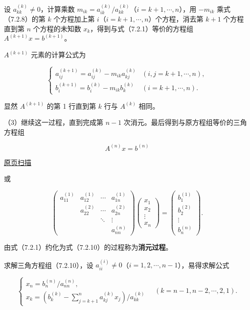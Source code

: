 \documentclass[
  10pt,
  fontset=fandol]{ctexart}
\begin{document}
设 \(a_{kk}^{(k)}\ne0\)，计算乘数 \(m_{ik}=a_{ik}^{(k)}/a_{kk}^{(k)}\)（\(i=k+1,\cdots,n\)），用 \(-m_{ik}\) 乘式（7.2.8）的第 \(k\) 个方程加上第 \(i\)（\(i=k+1,\cdots,n\)）个方程，消去第 \(k+1\) 个方程直到第 \(n\) 个方程的未知数 \(x_k\)，得到与式（7.2.1）等价的方程组 \(A^{(k+1)}x=b^{(k+1)}\)。

\(A^{(k+1)}\) 元素的计算公式为

\[
\begin{cases}
a_{ij}^{(k+1)}=a_{ij}^{(k)}-m_{ik}a_{kj}^{(k)}& (i,j=k+1,\cdots,n),\\
b_i^{(k+1)}=b_i^{(k)}-m_{ik}b_k^{(k)}& (i=k+1,\cdots,n).
\end{cases}
\tag{7.2.9}
\]

显然 \(A^{(k+1)}\) 的第 1 行直到第 \(k\) 行与 \(A^{(k)}\) 相同。

（3）继续这一过程，直到完成第 \(n-1\) 次消元。最后得到与原方程组等价的三角方程组

\[A^{(n)}x=b^{(n)}\tag{7.2.10}\]

\href{../../source-images/pdf-180.jpeg}{原页扫描}

或

\[
\begin{pmatrix}
a_{11}^{(1)}&a_{12}^{(1)}&\cdots&a_{1n}^{(1)}\\
&a_{22}^{(2)}&\cdots&a_{2n}^{(2)}\\
&&\ddots&\vdots\\
&&&a_{nn}^{(n)}
\end{pmatrix}
\begin{pmatrix}x_1\\x_2\\\vdots\\x_n\end{pmatrix}
=\begin{pmatrix}b_1^{(1)}\\b_2^{(2)}\\\vdots\\b_n^{(n)}\end{pmatrix}.
\]

由式（7.2.1）约化为式（7.2.10）的过程称为\textbf{消元过程}。

求解三角方程组（7.2.10），设 \(a_{ii}^{(i)}\ne0\)（\(i=1,2,\cdots,n-1\)），易得求解公式

\[
\begin{cases}
x_n=b_n^{(n)}/a_{nn}^{(n)},\\
x_k=\displaystyle\left(b_k^{(k)}-\sum_{j=k+1}^{n}a_{kj}^{(k)}x_j\right)/a_{kk}^{(k)}
\end{cases}
\quad(k=n-1,n-2,\cdots,2,1).
\tag{7.2.11}
\]
\end{document}
